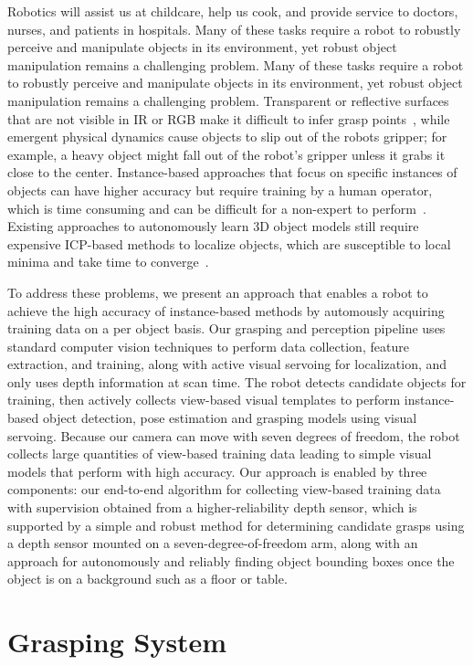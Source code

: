 \documentclass[graybox]{svmult}
\begin{document}
Robotics will assist us at childcare, help us cook, and provide
service to doctors, nurses, and patients in hospitals. Many of these
tasks require a robot to robustly perceive and manipulate objects in
its environment, yet robust object manipulation remains a challenging
problem.  Many of these tasks require a robot to robustly perceive and
manipulate objects in its environment, yet robust object manipulation
remains a challenging problem.  Transparent or reflective surfaces
that are not visible in IR or RGB make it difficult to infer grasp
points~\citep{lysenkov13}, while emergent physical dynamics cause
objects to slip out of the robots gripper; for example, a heavy object
might fall out of the robot's gripper unless it grabs it close to the
center.  Instance-based approaches that focus on specific instances of
objects can have higher accuracy but require training by a human
operator, which is time consuming and can be difficult for a
non-expert to perform~\citep{ork14, lai11, lai11a}.  Existing
approaches to autonomously learn 3D object models still require
expensive ICP-based methods to localize objects, which are susceptible
to local minima and take time to converge~\citep{krainin11}.

To address these problems, we present an approach that enables a robot
to achieve the high accuracy of instance-based methods by automously
acquiring training data on a per object basis. Our grasping and
perception pipeline uses standard computer vision techniques to
perform data collection, feature extraction, and training, along with
active visual servoing for localization, and only uses depth
information at scan time.  The robot detects candidate objects for
training, then actively collects view-based visual templates to
perform instance-based object detection, pose estimation and grasping
models using visual servoing.  Because our camera can move with seven
degrees of freedom, the robot collects large quantities of view-based
training data leading to simple visual models that perform with high
accuracy.  Our approach is enabled by three components: our end-to-end
algorithm for collecting view-based training data with supervision
obtained from a higher-reliability depth sensor, which is supported by
a simple and robust method for determining candidate grasps using a
depth sensor mounted on a seven-degree-of-freedom arm, along with an
approach for autonomously and reliably finding object bounding boxes
once the object is on a background such as a floor or table.


\section{Grasping System}
\end{document}
